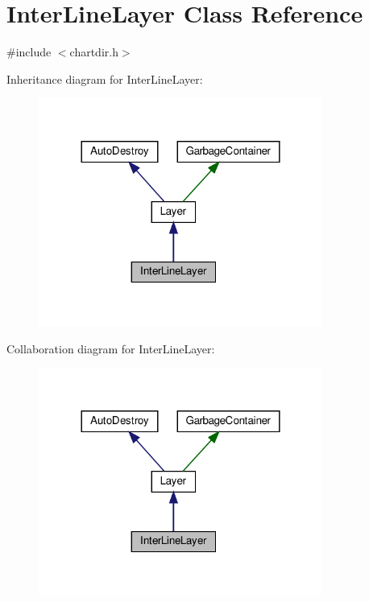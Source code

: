 \hypertarget{class_inter_line_layer}{}\section{Inter\+Line\+Layer Class Reference}
\label{class_inter_line_layer}


{\ttfamily \#include $<$chartdir.\+h$>$}



Inheritance diagram for Inter\+Line\+Layer\+:
\nopagebreak
\begin{figure}[H]
\begin{center}
\leavevmode
\includegraphics[width=264pt]{class_inter_line_layer__inherit__graph}
\end{center}
\end{figure}


Collaboration diagram for Inter\+Line\+Layer\+:
\nopagebreak
\begin{figure}[H]
\begin{center}
\leavevmode
\includegraphics[width=264pt]{class_inter_line_layer__coll__graph}
\end{center}
\end{figure}
